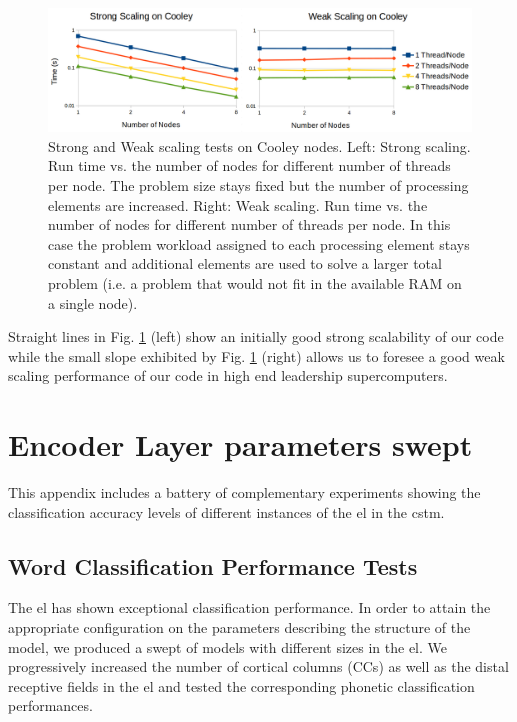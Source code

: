 \documentclass{book}
\begin{document}
\begin{appendices}
\begin{figure}[h!]
    \centering
    \includegraphics[width=1.0\textwidth]{Strong_Weak.png}
    \caption{Strong and Weak scaling tests on Cooley nodes. Left: Strong scaling. Run time vs. the number of nodes for different number of threads per node.
	    The problem size stays fixed but the number of processing elements are increased.
    Right: Weak scaling. Run time vs. the number of nodes for different number of threads per node.
    In this case the problem workload assigned to each processing element stays constant and additional elements are used to solve a larger total problem (i.e. a problem that would not fit in the available RAM on a single node).}
    \label{fig:Strong_Weak}
\end{figure}

Straight lines in Fig. \ref{fig:Strong_Weak} (left) show an initially good strong scalability of our code while the small slope exhibited by Fig. \ref{fig:Strong_Weak} (right) allows us to foresee a good weak scaling performance of our code in high end leadership supercomputers.

\chapter{Encoder Layer parameters swept}
\label{EL_Parameters_Swept}

This appendix includes a battery of complementary experiments showing the classification accuracy levels of different instances of the \gls{el} in the \gls{cstm}.

\section{Word Classification Performance Tests}

The \gls{el} has shown exceptional classification performance. In order to attain the appropriate configuration on the parameters describing the structure of the model, we produced a swept of models with different sizes in the \gls{el}. We progressively increased the number of cortical columns (CCs) as well as the distal receptive fields in the \gls{el} and tested the corresponding phonetic classification performances.


\end{appendices}
\end{document}

